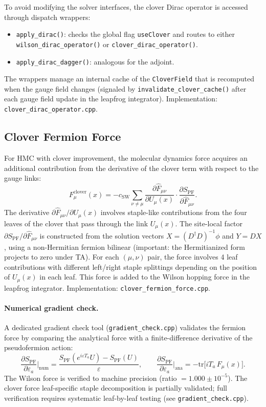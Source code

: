 \documentclass[12pt]{article}
\newcommand{\tr}{\mathrm{tr}}
\newcommand{\code}[1]{\texttt{#1}}
\begin{document}
To avoid modifying the solver interfaces, the clover Dirac operator is accessed through dispatch wrappers:
\begin{itemize}
\item \code{apply\_dirac()}: checks the global flag \code{useClover} and routes to either \code{wilson\_dirac\_operator()} or \code{clover\_dirac\_operator()}.
\item \code{apply\_dirac\_dagger()}: analogous for the adjoint.
\end{itemize}
The wrappers manage an internal cache of the \code{CloverField} that is recomputed when the gauge field changes (signaled by \code{invalidate\_clover\_cache()} after each gauge field update in the leapfrog integrator). Implementation: \code{clover\_dirac\_operator.cpp}.

\subsection{Clover Fermion Force}

For HMC with clover improvement, the molecular dynamics force acquires an additional contribution from the derivative of the clover term with respect to the gauge links:
\begin{equation}
F_\mu^{\mathrm{clover}}(x) = -c_{\mathrm{SW}} \sum_{\nu \neq \mu} \frac{\partial \hat{F}_{\mu\nu}}{\partial U_\mu(x)} \cdot \frac{\partial S_{\mathrm{PF}}}{\partial \hat{F}_{\mu\nu}}.
\end{equation}
The derivative $\partial \hat{F}_{\mu\nu}/\partial U_\mu(x)$ involves staple-like contributions from the four leaves of the clover that pass through the link $U_\mu(x)$. The site-local factor $\partial S_{\mathrm{PF}}/\partial \hat{F}_{\mu\nu}$ is constructed from the solution vectors $X = (D^\dagger D)^{-1}\phi$ and $Y = DX$, using a non-Hermitian fermion bilinear (important: the Hermitianized form projects to zero under TA). For each $(\mu,\nu)$ pair, the force involves 4 leaf contributions with different left/right staple splittings depending on the position of $U_\mu(x)$ in each leaf. This force is added to the Wilson hopping force in the leapfrog integrator. Implementation: \code{clover\_fermion\_force.cpp}.

\paragraph{Numerical gradient check.}
A dedicated gradient check tool (\code{gradient\_check.cpp}) validates the fermion force by comparing the analytical force with a finite-difference derivative of the pseudofermion action:
\begin{equation}
  \frac{\partial S_{\mathrm{PF}}}{\partial \varepsilon_a}\bigg|_{\mathrm{num}}
  = \frac{S_{\mathrm{PF}}(e^{i\varepsilon T_a} U) - S_{\mathrm{PF}}(U)}{\varepsilon},
  \qquad
  \frac{\partial S_{\mathrm{PF}}}{\partial \varepsilon_a}\bigg|_{\mathrm{ana}}
  = -\tr\bigl[i T_a\, F_\mu(x)\bigr].
\end{equation}
The Wilson force is verified to machine precision (ratio $= 1.000 \pm 10^{-5}$). The clover force leaf-specific staple decomposition is partially validated; full verification requires systematic leaf-by-leaf testing (see \code{gradient\_check.cpp}).
\end{document}
